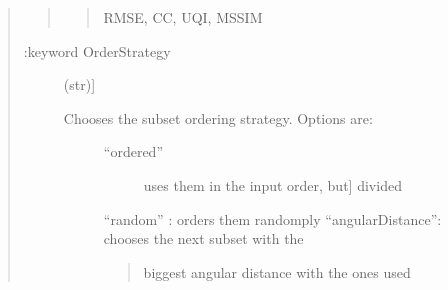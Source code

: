 \documentclass[letterpaper,10pt,english]{sphinxmanual}
\begin{document}
\begin{fulllineitems}
\begin{quote}
\begin{quote}
\begin{description}
\begin{quote}
RMSE, CC, UQI, MSSIM
\end{quote}

\end{description}\end{quote}
\begin{description}
\item[{:keyword OrderStrategy}] \leavevmode{[}(str){]}\begin{description}
\item[{Chooses the subset ordering strategy. Options are:}] \leavevmode\begin{description}
\item[{“ordered”}] \leavevmode{[}uses them in the input order, but{]}
divided

\end{description}

“random”         : orders them randomply
“angularDistance”: chooses the next subset with the
\begin{quote}

biggest angular distance with the
ones used
\end{quote}

\end{description}

\end{description}


\end{quote}
\end{fulllineitems}
\end{document}
